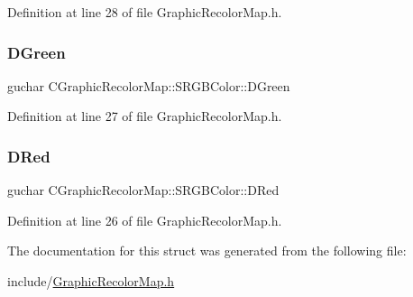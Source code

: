 Definition at line 28 of file Graphic\+Recolor\+Map.\+h.

\hypertarget{structCGraphicRecolorMap_1_1SRGBColor_aff20fa0c0e6037339a1232cb2b899774}{}\label{structCGraphicRecolorMap_1_1SRGBColor_aff20fa0c0e6037339a1232cb2b899774} 
\subsubsection{\texorpdfstring{D\+Green}{DGreen}}
{\footnotesize\ttfamily guchar C\+Graphic\+Recolor\+Map\+::\+S\+R\+G\+B\+Color\+::\+D\+Green}



Definition at line 27 of file Graphic\+Recolor\+Map.\+h.

\hypertarget{structCGraphicRecolorMap_1_1SRGBColor_a8562e30b0e4489fdde36eddd19c7de40}{}\label{structCGraphicRecolorMap_1_1SRGBColor_a8562e30b0e4489fdde36eddd19c7de40} 
\subsubsection{\texorpdfstring{D\+Red}{DRed}}
{\footnotesize\ttfamily guchar C\+Graphic\+Recolor\+Map\+::\+S\+R\+G\+B\+Color\+::\+D\+Red}



Definition at line 26 of file Graphic\+Recolor\+Map.\+h.



The documentation for this struct was generated from the following file\+:\begin{DoxyCompactItemize}
\item 
include/\hyperlink{GraphicRecolorMap_8h}{Graphic\+Recolor\+Map.\+h}\end{DoxyCompactItemize}
